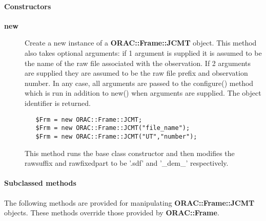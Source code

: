 \paragraph*{Constructors\label{ORAC::Frame::JCMT_Constructors}}\begin{description}
\item[\textbf{new}] \mbox{}

Create a new instance of a \textbf{ORAC::Frame::JCMT} object.
This method also takes optional arguments:
if 1 argument is  supplied it is assumed to be the name
of the raw file associated with the observation. If 2 arguments
are supplied they are assumed to be the raw file prefix and
observation number. In any case, all arguments are passed to
the configure() method which is run in addition to new()
when arguments are supplied.
The object identifier is returned.

\begin{verbatim}
   $Frm = new ORAC::Frame::JCMT;
   $Frm = new ORAC::Frame::JCMT("file_name");
   $Frm = new ORAC::Frame::JCMT("UT","number");
\end{verbatim}


This method runs the base class constructor and then modifies
the rawsuffix and rawfixedpart to be '.sdf' and '\_dem\_'
respectively.

\end{description}
\paragraph*{Subclassed methods\label{ORAC::Frame::JCMT_Subclassed_methods}}

The following methods are provided for manipulating
\textbf{ORAC::Frame::JCMT} objects. These methods override those
provided by \textbf{ORAC::Frame}.

